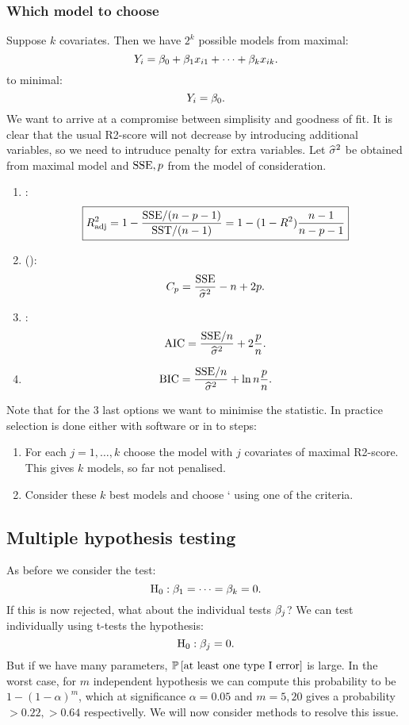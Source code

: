\subsubsection{Which model to choose}
Suppose $k$ covariates. Then we have $2^k$ possible models from maximal:
$$
    Y_i = \beta_0+\beta_1x_{i1} + \dots + \beta_kx_{ik}.
$$
to minimal:
$$
    Y_i = \beta_0.
$$
We want to arrive at a compromise between simplisity and goodness of fit. It is clear that the usual R2-score will not decrease by introducing additional variables, so we need to intruduce penalty for extra variables. Let $\widehat{\sigma}^2$ be obtained from maximal model and $\mathrm{SSE}, p$ from the model of consideration.
\begin{enumerate}
    \item {}:
    $$
        \boxed{R^2_{\mathrm{adj}} = 1 - \frac{\mathrm{SSE} / (n-p-1)}{\mathrm{SST} / (n-1)} = 1 - (1-R^2)\frac{n-1}{n-p-1}}
    $$
    \item {} ():
    $$
        C_p = \frac{\mathrm{SSE}}{\widehat{\sigma}^2} - n + 2p.
    $$
    \item {}:
    $$
        \mathrm{AIC} = \frac{\mathrm{SSE}/n}{\widehat{\sigma}^2} + 2\frac{p}{n}.
    $$
    \item {}
    $$
        \mathrm{BIC} = \frac{\mathrm{SSE}/n}{\widehat{\sigma}^2} + \ln{n}\frac{p}{n}.
    $$
\end{enumerate}
Note that for the 3 last options we want to minimise the statistic. In practice selection is done either with software or in to steps:
\begin{enumerate}
    \item For each $j=1,\dots,k$ choose the model with $j$ covariates of maximal R2-score. This gives $k$ models, so far not penalised.
    \item Consider these $k$ best models and choose ` using one of the criteria. 
\end{enumerate}


\subsection{Multiple hypothesis testing}
As before we consider the test:
$$
    \mathrm{H}_0 : \beta_1=\dots=\beta_k = 0.
$$
If this is now rejected, what about the individual tests $\beta_j$? We can test individually using t-tests the hypothesis:
$$
    \mathrm{H}_0 : \beta_j = 0.
$$
But if we have many parameters, $\mathbb{P}\left[\textrm{at least one type I error}\right]$ is large. In the worst case, for $m$ independent hypothesis we can compute this probability to be $1-(1-\alpha)^m$, which at significance $\alpha=0.05$ and $m=5, 20$ gives a probability $>0.22, >0.64$ respectivelly. We will now consider methods to resolve this issue. 

